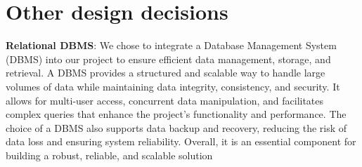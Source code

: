 \section{Other design decisions}

\textbf{Relational DBMS}: 
We chose to integrate a Database Management System (DBMS) into our project to ensure efficient data management, storage, and retrieval. A DBMS provides a structured and scalable way to handle large volumes of data while maintaining data integrity, consistency, and security. It allows for multi-user access, concurrent data manipulation, and facilitates complex queries that enhance the project's functionality and performance. The choice of a DBMS also supports data backup and recovery, reducing the risk of data loss and ensuring system reliability. Overall, it is an essential component for building a robust, reliable, and scalable solution